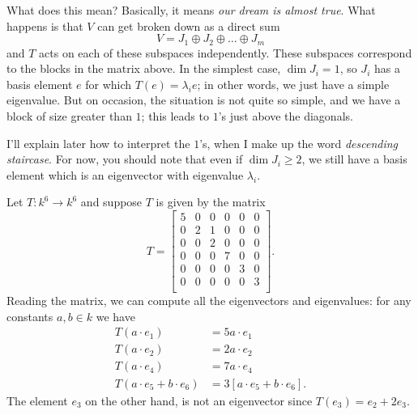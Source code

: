 What does this mean?
Basically, it means \emph{our dream is almost true}.
What happens is that $V$ can get broken down as a direct sum
\[ V = J_1 \oplus J_2 \oplus \dots \oplus J_m \]
and $T$ acts on each of these subspaces independently.
These subspaces correspond to the blocks in the matrix above.
In the simplest case, $\dim J_i = 1$,
so $J_i$ has a basis element $e$
for which $T(e) = \lambda_i e$;
in other words, we just have a simple eigenvalue.
But on occasion, the situation is not quite so simple,
and we have a block of size greater than $1$;
this leads to $1$'s just above the diagonals.

I'll explain later how to interpret the $1$'s,
when I make up the word \emph{descending staircase}.
For now, you should note that even if $\dim J_i \ge 2$,
we still have a basis element
which is an eigenvector with eigenvalue $\lambda_i$.

\begin{example}
	Let $T \colon k^6 \to k^6$ and suppose $T$ is given by the matrix
	\[
		T = \begin{bmatrix}
			5 & 0 & 0 & 0 & 0 & 0 \\
			0 & 2 & 1 & 0 & 0 & 0 \\
			0 & 0 & 2 & 0 & 0 & 0 \\
			0 & 0 & 0 & 7 & 0 & 0 \\
			0 & 0 & 0 & 0 & 3 & 0 \\
			0 & 0 & 0 & 0 & 0 & 3 \\
		\end{bmatrix}.
	\]
	Reading the matrix, we can compute all the eigenvectors and eigenvalues:
	for any constants $a, b \in k$ we have
	\begin{align*}
		T(a \cdot e_1) &= 5a \cdot e_1 \\
		T(a \cdot e_2) &= 2a \cdot e_2 \\
		T(a \cdot e_4) &= 7a \cdot e_4 \\
		T(a \cdot e_5 + b \cdot e_6) &= 3\left[ a \cdot e_5 + b \cdot e_6 \right].
	\end{align*}
	The element $e_3$ on the other hand,
	is not an eigenvector since $T(e_3) = e_2 + 2e_3$.
\end{example}

%

